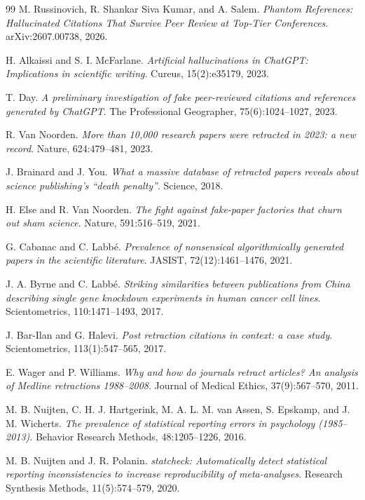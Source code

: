 \documentclass{article}
\begin{document}
{\begin{thebibliography}{99}
M. Russinovich, R. Shankar Siva Kumar, and A. Salem.
\textit{Phantom References: Hallucinated Citations That Survive Peer Review at Top-Tier Conferences}.
arXiv:2607.00738, 2026.

H. Alkaissi and S. I. McFarlane.
\textit{Artificial hallucinations in ChatGPT: Implications in scientific writing}.
Cureus, 15(2):e35179, 2023.

T. Day.
\textit{A preliminary investigation of fake peer-reviewed citations and references generated by ChatGPT}.
The Professional Geographer, 75(6):1024--1027, 2023.

R. Van Noorden.
\textit{More than 10,000 research papers were retracted in 2023: a new record}.
Nature, 624:479--481, 2023.

J. Brainard and J. You.
\textit{What a massive database of retracted papers reveals about science publishing's ``death penalty''}.
Science, 2018.

H. Else and R. Van Noorden.
\textit{The fight against fake-paper factories that churn out sham science}.
Nature, 591:516--519, 2021.

G. Cabanac and C. Labb\'{e}.
\textit{Prevalence of nonsensical algorithmically generated papers in the scientific literature}.
JASIST, 72(12):1461--1476, 2021.

J. A. Byrne and C. Labb\'{e}.
\textit{Striking similarities between publications from China describing single gene knockdown experiments in human cancer cell lines}.
Scientometrics, 110:1471--1493, 2017.

J. Bar-Ilan and G. Halevi.
\textit{Post retraction citations in context: a case study}.
Scientometrics, 113(1):547--565, 2017.

E. Wager and P. Williams.
\textit{Why and how do journals retract articles? An analysis of Medline retractions 1988--2008}.
Journal of Medical Ethics, 37(9):567--570, 2011.

M. B. Nuijten, C. H. J. Hartgerink, M. A. L. M. van Assen, S. Epskamp, and J. M. Wicherts.
\textit{The prevalence of statistical reporting errors in psychology (1985--2013)}.
Behavior Research Methods, 48:1205--1226, 2016.

M. B. Nuijten and J. R. Polanin.
\textit{statcheck: Automatically detect statistical reporting inconsistencies to increase reproducibility of meta-analyses}.
Research Synthesis Methods, 11(5):574--579, 2020.


\end{thebibliography}}
\end{document}
